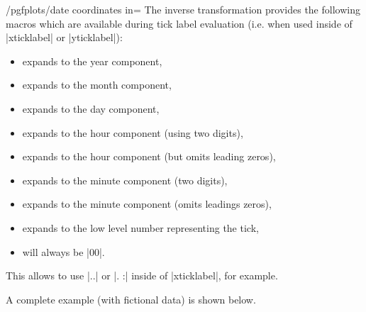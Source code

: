 \begin{stylekey}{/pgfplots/date coordinates in=}
	The inverse transformation provides the following macros which are available during tick label evaluation (i.e. when used inside of |xticklabel| or |yticklabel|):
	\begin{itemize}
		\item \declareandlabel{\year} expands to the year component,
		\item \declareandlabel{\month} expands to the month component,
		\item \declareandlabel{\day} expands to the day component,
		\item \declareandlabel{\hour} expands to the hour component (using two digits),
		\item \declareandlabel{\Hour} expands to the hour component (but omits leading zeros),
		\item \declareandlabel{\minute} expands to the minute component (two digits),
		\item \declareandlabel{\Minute} expands to the minute component (omits leadings zeros),
		\item \declareandlabel{\lowlevel} expands to the low level number representing the tick,
		\item \declareandlabel{\second} will always be |00|.
	\end{itemize}
	This allows to use |\day.\month.\year| or |\day. \hour:\minute| inside of |xticklabel|, for example.

	A complete example (with fictional data) is shown below.
\begin{codeexample}[]


\end{codeexample}


\end{stylekey}
